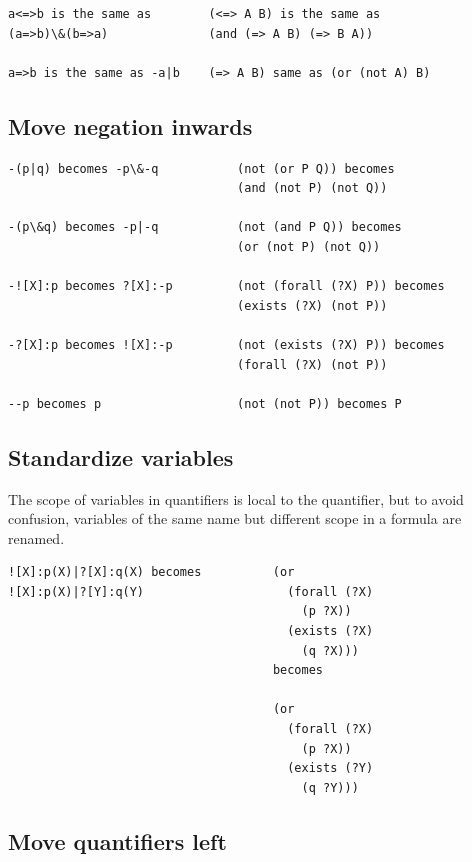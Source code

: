 \documentclass{book}
\begin{document}
\begin{verbatim}
a<=>b is the same as        (<=> A B) is the same as
(a=>b)\&(b=>a)              (and (=> A B) (=> B A))

a=>b is the same as -a|b    (=> A B) same as (or (not A) B)
\end{verbatim}

\subsection{Move negation inwards}

\begin{verbatim}
-(p|q) becomes -p\&-q           (not (or P Q)) becomes
                                (and (not P) (not Q))

-(p\&q) becomes -p|-q           (not (and P Q)) becomes
                                (or (not P) (not Q))

-![X]:p becomes ?[X]:-p	        (not (forall (?X) P)) becomes
                                (exists (?X) (not P))

-?[X]:p becomes ![X]:-p	        (not (exists (?X) P)) becomes
                                (forall (?X) (not P))

--p becomes p                   (not (not P)) becomes P
\end{verbatim}

\subsection{Standardize variables}

The scope of variables in quantifiers is local to the quantifier, but to avoid
confusion, variables of the same name but different scope in a formula are
renamed.

\begin{verbatim}
![X]:p(X)|?[X]:q(X) becomes          (or
![X]:p(X)|?[Y]:q(Y)                    (forall (?X)
                                         (p ?X))
                                       (exists (?X)
                                         (q ?X)))
                                     becomes

                                     (or
                                       (forall (?X)
                                         (p ?X))
                                       (exists (?Y)
                                         (q ?Y)))
\end{verbatim}

\subsection{Move quantifiers left}
\end{document}
